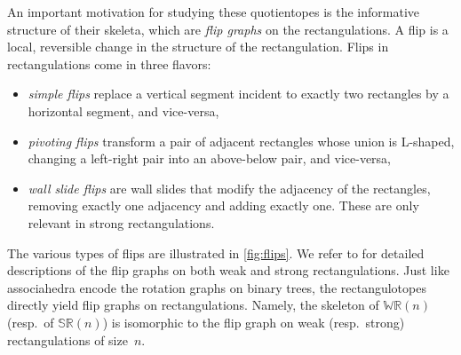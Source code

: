 \documentclass{amsart}
\theoremstyle{definition}
\newcommand{\darkblue}{\color{darkblue}} %
\newcommand{\defn}[1]{\textsl{\darkblue #1}} %
\newcommand{\polytope}[1]{\mathds{#1}} %
\newcommand{\WRP}{\polytope{WR}} %
\newcommand{\SRP}{\polytope{SR}} %
\begin{document}
An important motivation for studying these quotientopes is the informative structure of their skeleta, which are \defn{flip graphs} on the rectangulations.
A flip is a local, reversible change in the structure of the rectangulation.
Flips in rectangulations come in three flavors:
\begin{itemize}
\item \defn{simple flips} replace a vertical segment incident to exactly two rectangles by a horizontal segment, and vice-versa,
\item \defn{pivoting flips} transform a pair of adjacent rectangles whose union is L-shaped, changing a left-right pair into an above-below pair, and vice-versa,
\item \defn{wall slide flips} are wall slides that modify the adjacency of the rectangles, removing exactly one adjacency and adding exactly one. These are only relevant in strong rectangulations.
\end{itemize}
The various types of flips are illustrated in \cref{fig:flips}.
We refer to \cite{MR2871762,MR3878132,MR3697823,ACFF24} for detailed descriptions of the flip graphs on both weak and strong rectangulations.
Just like associahedra encode the rotation graphs on binary trees, the rectangulotopes directly yield flip graphs on rectangulations.
Namely, the skeleton of $\WRP(n)$ (resp.~of $\SRP(n)$) is isomorphic to the flip graph on weak (resp.~strong) rectangulations of size~$n$.
\end{document}
